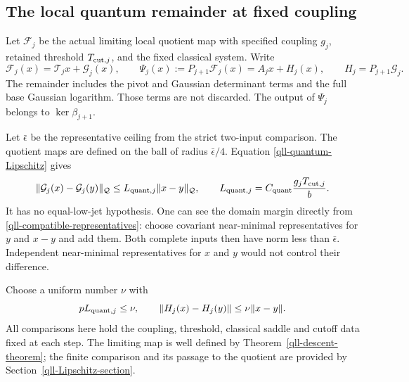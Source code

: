 \subsection{The local quantum remainder at fixed coupling}
\label{eqr-quantum-section}

Let $\mathcal F_j$ be the actual limiting local quotient map with
specified coupling $g_j$, retained threshold $T_{{\rm cut},j}$,
and the fixed classical system. Write
\begin{equation}
 \mathcal F_j(x)=\mathcal T_jx+\mathcal G_j(x),\qquad
 \Psi_j(x):=P_{j+1}\mathcal F_j(x)=A_jx+H_j(x),
 \qquad H_j=P_{j+1}\mathcal G_j.
 \label{eqr-quantum-split}
\end{equation}
The remainder includes the pivot and Gaussian determinant terms and
the full base Gaussian logarithm. Those terms are not discarded.
The output of $\Psi_j$ belongs to $\ker\beta_{j+1}$.

Let $\bar\epsilon$ be the representative ceiling from the strict
two-input comparison. The quotient maps are defined on the ball of
radius $\bar\epsilon/4$. Equation
\eqref{qll-quantum-Lipschitz} gives
\begin{equation}
 \|\mathcal G_j(x)-\mathcal G_j(y)\|_{\mathcal Q}
 \le L_{{\rm quant},j}\|x-y\|_{\mathcal Q},\qquad
 L_{{\rm quant},j}
       =C_{\rm quant}\frac{g_jT_{{\rm cut},j}}b.
 \label{eqr-quantum-lipschitz}
\end{equation}
It has no equal-low-jet hypothesis. One can see the domain margin
directly from \eqref{qll-compatible-representatives}: choose
covariant near-minimal representatives for $y$ and $x-y$ and add
them. Both complete inputs then have norm less than
$\bar\epsilon$. Independent near-minimal representatives for $x$
and $y$ would not control their difference.

Choose a uniform number $\nu$ with
\begin{equation}
 pL_{{\rm quant},j}\le\nu,\qquad
 \|H_j(x)-H_j(y)\|\le\nu\|x-y\|.
 \label{eqr-projected-lipschitz}
\end{equation}
All comparisons here hold the coupling, threshold, classical saddle
and cutoff data fixed at each step. The limiting map is well defined
by Theorem~\ref{qll-descent-theorem}; the finite comparison and its
passage to the quotient are provided by
Section~\ref{qll-Lipschitz-section}.

